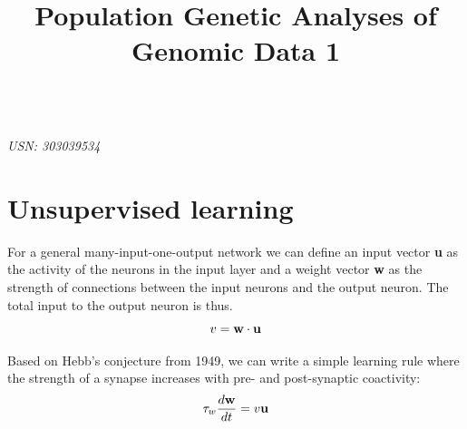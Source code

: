 \documentclass{article}
\title{Population Genetic Analyses of Genomic Data 1}
\begin{document}

\begin{center}
\textbf{\LARGE{}}\\

\textit{USN: 303039534}\\
\end{center}


\section{Unsupervised learning}

For a general many-input-one-output network we can define an input vector \textbf{u} as the activity of the neurons in the input layer and a weight vector \textbf{w} as the strength of connections between the input neurons and the output neuron. The total input to the output neuron is thus.
\begin{equation}
v = \bf{w} \cdot \bf{u} 
\end{equation}

Based on Hebb's conjecture from 1949, we can write a simple learning rule where the strength of a synapse increases with pre- and post-synaptic coactivity:
\begin{equation}
\tau_w \dfrac{d\bf{w}}{dt} = v \bf{u}
\end{equation}
\end{document}
